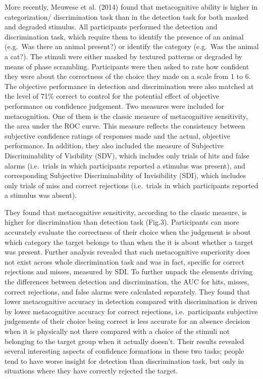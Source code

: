 \documentclass[]{article}
\begin{document}
More recently, Meuwese et al. (2014) found that metacognitive ability is
higher in categorization/ discrimination task than in the detection task
for both masked and degraded stimulus. All participants performed the
detection and discrimination task, which require them to identify the
presence of an animal (e.g.~Was there an animal present?) or identify
the category (e.g.~Was the animal a cat?). The stimuli were either
masked by textured patterns or degraded by means of phase scrambling.
Participants were then asked to rate how confident they were about the
correctness of the choice they made on a scale from 1 to 6. The
objective performance in detection and discrimination were also matched
at the level of 71\% correct to control for the potential effect of
objective performance on confidence judgement. Two measures were
included for metacognition. One of them is the classic measure of
metacognitive sensitivity, the area under the ROC curve. This measure
reflects the consistency between subjective confidence ratings of
responses made and the actual, objective performance. In addition, they
also included the measure of Subjective Discriminability of Visibility
(SDV), which includes only trials of hits and false alarms (i.e.~trials
in which participants reported a stimulus was present), and
corresponding Subjective Discriminability of Invisibility (SDI), which
includes only trials of miss and correct rejections (i.e.~trials in
which participants reported a stimulus was absent).

They found that metacognitive sensitivity, according to the classic
measure, is higher for discrimination than detection task (Fig.3).
Participants can more accurately evaluate the correctness of their
choice when the judgement is about which category the target belongs to
than when the it is about whether a target was present. Further analysis
revealed that such metacognitive superiority does not exist across whole
discrimination task and was in fact, specific for correct rejections and
misses, measured by SDI. To further unpack the elements driving the
differences between detection and discrimination, the AUC for hits,
misses, correct rejections, and false alarms were calculated separately.
They found that lower metacognitive accuracy in detection compared with
discrimination is driven by lower metacognitive accuracy for correct
rejections, i.e.~participants subjective judgements of their choice
being correct is less accurate for an absence decision when it is
physically not there compared with a choice of the stimuli not belonging
to the target group when it actually doesn't. Their results revealed
several interesting aspects of confidence formations in these two tasks;
people tend to have worse insight for detection than discrimination
task, but only in situations where they have correctly rejected the
target.
\end{document}
